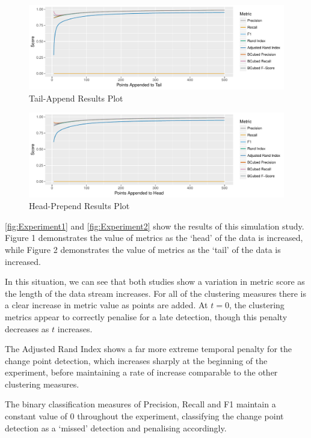\documentclass[../main.tex]{subfiles}
\begin{document}
\begin{figure}[h]
    \includegraphics[width=\textwidth]{figures/Experiment1}
    \caption{Tail-Append Results Plot}
    \label{fig:Experiment1}
\end{figure}

\begin{figure}[h]
    \includegraphics[width=\textwidth]{figures/Experiment4}
    \caption{Head-Prepend Results Plot}
    \label{fig:Experiment2}
\end{figure}

\autoref{fig:Experiment1} and \autoref{fig:Experiment2} show the results of this simulation study. Figure 1 demonstrates the value of metrics as the `head' of the data is increased, while Figure 2 demonstrates the value of metrics as the `tail' of the data is increased.

In this situation, we can see that both studies show a variation in metric score as the length of the data stream increases. For all of the clustering measures there is a clear increase in metric value as points are added. At $t=0$, the clustering metrics appear to correctly penalise for a late detection, though this penalty decreases as $t$ increases.

The Adjusted Rand Index shows a far more extreme temporal penalty for the change point detection, which increases sharply at the beginning of the experiment, before maintaining a rate of increase comparable to the other clustering measures.

The binary classification measures of Precision, Recall and F1 maintain a constant value of $0$ throughout the experiment, classifying the change point detection as a `missed' detection and penalising accordingly.
\end{document}
